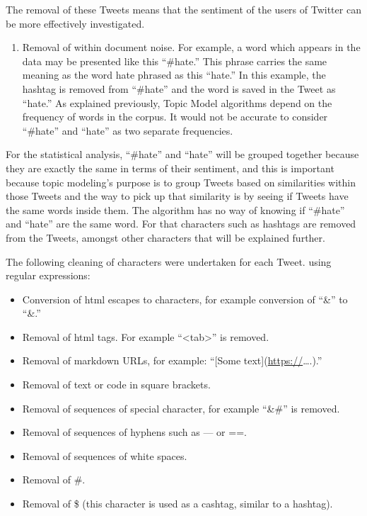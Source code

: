 \documentclass[
]{article}
\providecommand{\tightlist}{%
  \setlength{\itemsep}{0pt}\setlength{\parskip}{0pt}}
\begin{document}
The removal of these Tweets means that the sentiment of the users of
Twitter can be more effectively investigated.

\begin{enumerate}
\def\labelenumi{\arabic{enumi}.}
\setcounter{enumi}{1}
\tightlist
\item
  Removal of within document noise. For example, a word which appears in
  the data may be presented like this ``\#hate.'' This phrase carries
  the same meaning as the word hate phrased as this ``hate.'' In this
  example, the hashtag is removed from ``\#hate'' and the word is saved
  in the Tweet as ``hate.'' As explained previously, Topic Model
  algorithms depend on the frequency of words in the corpus. It would
  not be accurate to consider ``\#hate'' and ``hate'' as two separate
  frequencies.
\end{enumerate}

For the statistical analysis, ``\#hate'' and ``hate'' will be grouped
together because they are exactly the same in terms of their sentiment,
and this is important because topic modeling's purpose is to group
Tweets based on similarities within those Tweets and the way to pick up
that similarity is by seeing if Tweets have the same words inside them.
The algorithm has no way of knowing if ``\#hate'' and ``hate'' are the
same word. For that characters such as hashtags are removed from the
Tweets, amongst other characters that will be explained further.

The following cleaning of characters were undertaken for each Tweet.
using regular expressions:

\begin{itemize}
\tightlist
\item
  Conversion of html escapes to characters, for example conversion of
  ``\&'' to ``\&.''
\item
  Removal of html tags. For example ``\textless tab\textgreater{}'' is
  removed.
\item
  Removal of markdown URLs, for example: ``{[}Some
  text{]}(\url{https://}\ldots.).''
\item
  Removal of text or code in square brackets.
\item
  Removal of sequences of special character, for example ``\&\#'' is
  removed.
\item
  Removal of sequences of hyphens such as --- or ==.
\item
  Removal of sequences of white spaces.
\item
  Removal of \#.
\item
  Removal of \$ (this character is used as a cashtag, similar to a
  hashtag).
\end{itemize}
\end{document}
